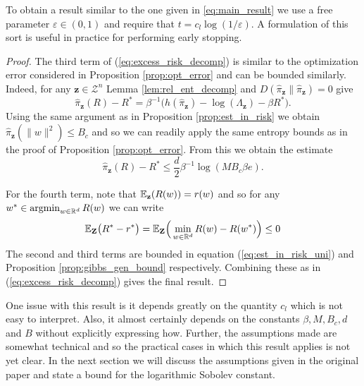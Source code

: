 \documentclass{article}
\newcommand{\Bbf}[1]{\mathbf{#1}}
\newcommand{\Bcal}[1]{\mathcal{#1}}
\begin{document}
To obtain a result similar to the one given in \ref{eq:main_result} we use a free parameter \(\varepsilon \in (0, 1)\) and require that \(t = c_l \log(1/\varepsilon)\). A formulation of this sort is useful in practice for performing early stopping.

\begin{proof}
The third term of (\ref{eq:excess_risk_decomp}) is similar to the optimization error considered in Proposition \ref{prop:opt_error} and can be bounded similarly. Indeed, for any \(\Bbf{z} \in \Bcal{Z}^n\) Lemma \ref{lem:rel_ent_decomp} and \(D(\hat{\pi}_{\Bbf{z}} \| \hat{\pi}_{\Bbf{z}}) = 0\) give
\begin{equation*}
    \hat{\pi}_{\Bbf{z}}(R) - R^* = \beta^{-1} \big ( h(\hat{\pi}_{\Bbf{z}}) - \log(\Lambda_{\Bbf{z}}) - \beta R^*).
\end{equation*}
Using the same argument as in Proposition \ref{prop:est_in_risk} we obtain \(\hat{\pi}_{\Bbf{z}}(\|w\|^2) \leq B_c\) and so we can readily apply the same entropy bounds as in the proof of Proposition \ref{prop:opt_error}. From this we obtain the estimate
\begin{equation*}
    \hat{\pi}_{\Bbf{z}}(R) - R^* \leq \frac{d}{2} \beta^{-1} \log(MB_c \beta e).
\end{equation*}

For the fourth term, note that \(\Bbb{E}_{\Bbf{z}}(R(w)) = r(w)\) and so for any \(w^* \in \operatorname{argmin}_{w \in \Bbb{R}^d} R(w)\) we can write
\begin{equation*}
    \Bbb{E}_{\Bbf{Z}}\big ( R^* - r^* \big ) = \Bbb{E}_{\Bbf{Z}} \Big ( \min_{w \in \Bbb{R}^d} R(w) - R(w^*) \Big ) \leq 0
\end{equation*}
The second and third terms are bounded in equation (\ref{eq:est_in_risk_uni}) and Proposition \ref{prop:gibbs_gen_bound} respectively. Combining these as in (\ref{eq:excess_risk_decomp}) gives the final result.
\end{proof}

One issue with this result is it depends greatly on the quantity \(c_l\) which is not easy to interpret. Also, it almost certainly depends on the constants \(\beta, M, B_c, d\) and \(B\) without explicitly expressing how. Further, the assumptions made are somewhat technical and so the practical cases in which this result applies is not yet clear. In the next section we will discuss the assumptions given in the original paper and state a bound for the logarithmic Sobolev constant.
\end{document}
